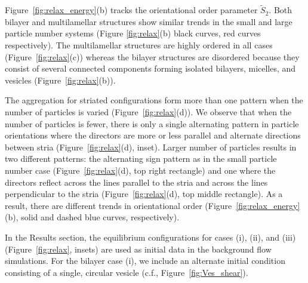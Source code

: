 \documentclass[prb,preprint,showpacs,preprintnumbers,amsmath,amssymb,longbibliography]{revtex4-1}
\begin{document}
Figure~\ref{fig:relax_energy}(b) 
tracks the orientational order parameter $\tilde{S}_2$.
Both bilayer and multilamellar
structures show similar trends in the small and large particle number systems
(Figure \ref{fig:relax}(b) black curves, red curves respectively).
The multilamellar structures are highly ordered in all cases (Figure~\ref{fig:relax}(c))
whereas the bilayer structures
are disordered because they consist of several connected
components forming isolated bilayers, micelles, and vesicles (Figure~\ref{fig:relax}(b)).


The aggregation for striated configurations form more than one 
pattern when the number of particles is varied (Figure~\ref{fig:relax}(d)).
We observe that when the number of particles is fewer, there is only
a single alternating pattern in particle orientations where the directors
are more or less parallel and alternate directions between stria (Figure~\ref{fig:relax}(d), inset).
Larger number of particles results in two different patterns: the alternating sign pattern
as in the small particle number case (Figure~\ref{fig:relax}(d), 
top right rectangle) and one where the directors reflect across the lines parallel
to the stria and across the lines perpendicular to the stria (Figure~\ref{fig:relax}(d),
top middle rectangle).
As a result, there are different trends in orientational order
(Figure~\ref{fig:relax_energy}(b), solid and dashed blue curves, respectively).


In the Results section,
the equilibrium configurations for cases (i), (ii), and (iii)
(Figure~\ref{fig:relax}, insets) are
used as initial data in the
background flow simulations. 
For the bilayer case (i), we include an alternate initial condition 
consisting of a single, circular vesicle (c.f., Figure~\ref{fig:Ves_shear}).


\end{document}
